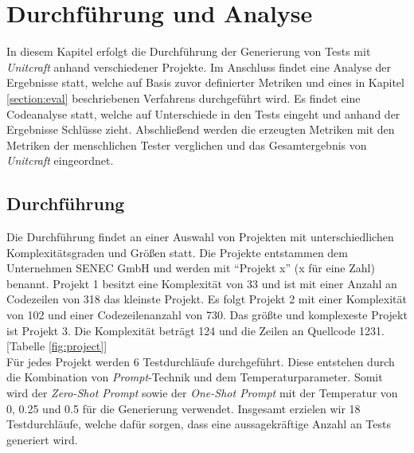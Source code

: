 \chapter{Durchführung und Analyse}\label{chap:analysis}
In diesem Kapitel erfolgt die Durchführung der Generierung von Tests mit \textit{Unitcraft} anhand verschiedener Projekte. Im Anschluss findet eine Analyse der Ergebnisse statt, welche auf Basis zuvor definierter Metriken und eines in Kapitel \ref{section:eval} beschriebenen Verfahrens durchgeführt wird. Es findet eine Codeanalyse statt, welche auf Unterschiede in den Tests eingeht und anhand der Ergebnisse Schlüsse zieht. Abschließend werden die erzeugten Metriken mit den Metriken der menschlichen Tester verglichen und das Gesamtergebnis von \textit{Unitcraft} eingeordnet.

\section{Durchführung}
Die Durchführung findet an einer Auswahl von Projekten mit unterschiedlichen Komplexitätsgraden und Größen statt. Die Projekte entstammen dem Unternehmen SENEC GmbH und werden mit ``Projekt x'' (x für eine Zahl) benannt. Projekt 1 besitzt eine Komplexität von 33 und ist mit einer Anzahl an Codezeilen von 318 das kleinste Projekt. Es folgt Projekt 2 mit einer Komplexität von 102 und einer Codezeilenanzahl von 730. Das größte und komplexeste Projekt ist Projekt 3. Die Komplexität beträgt 124 und die Zeilen an Quellcode 1231. [Tabelle \ref{fig:project}]\\Für jedes Projekt werden 6 Testdurchläufe durchgeführt. Diese entstehen durch die Kombination von \textit{Prompt}-Technik und dem Temperaturparameter. Somit wird der \textit{Zero-Shot Prompt} sowie der \textit{One-Shot Prompt} mit der Temperatur von 0, 0.25 und 0.5 für die Generierung verwendet. Insgesamt erzielen wir 18 Testdurchläufe, welche dafür sorgen, dass eine aussagekräftige Anzahl an Tests generiert wird.

